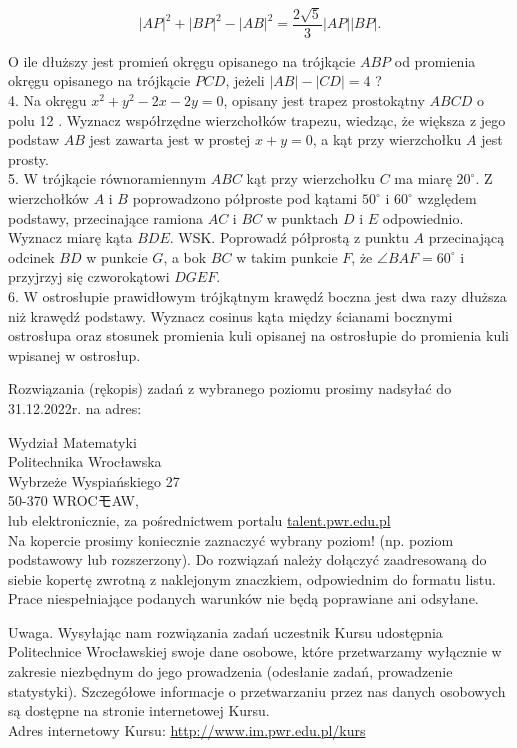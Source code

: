 \documentclass[10pt]{article}
\begin{document}
$$
|A P|^{2}+|B P|^{2}-|A B|^{2}=\frac{2 \sqrt{5}}{3}|A P||B P| .
$$

O ile dłuższy jest promień okręgu opisanego na trójkącie $A B P$ od promienia okręgu opisanego na trójkącie $P C D$, jeżeli $|A B|-|C D|=4$ ?\\
4. Na okręgu $x^{2}+y^{2}-2 x-2 y=0$, opisany jest trapez prostokątny $A B C D$ o polu 12 . Wyznacz współrzędne wierzchołków trapezu, wiedząc, że większa z jego podstaw $A B$ jest zawarta jest w prostej $x+y=0$, a kąt przy wierzchołku $A$ jest prosty.\\
5. W trójkącie równoramiennym $A B C$ kąt przy wierzchołku $C$ ma miarę $20^{\circ}$. Z wierzchołków $A$ i $B$ poprowadzono półproste pod kątami $50^{\circ}$ i $60^{\circ}$ względem podstawy, przecinające ramiona $A C$ i $B C$ w punktach $D$ i $E$ odpowiednio. Wyznacz miarę kąta $B D E$. WSK. Poprowadź półprostą z punktu $A$ przecinającą odcinek $B D$ w punkcie $G$, a bok $B C$ w takim punkcie $F$, że $\angle B A F=60^{\circ}$ i przyjrzyj się czworokątowi $D G E F$.\\
6. W ostrosłupie prawidłowym trójkątnym krawędź boczna jest dwa razy dłuższa niż krawędź podstawy. Wyznacz cosinus kąta między ścianami bocznymi ostrosłupa oraz stosunek promienia kuli opisanej na ostrosłupie do promienia kuli wpisanej w ostrosłup.

Rozwiązania (rękopis) zadań z wybranego poziomu prosimy nadsyłać do 31.12.2022r. na adres:

Wydział Matematyki\\
Politechnika Wrocławska\\
Wybrzeże Wyspiańskiego 27\\
50-370 WROCモAW,\\
lub elektronicznie, za pośrednictwem portalu \href{http://talent.pwr.edu.pl}{talent.pwr.edu.pl}\\
Na kopercie prosimy koniecznie zaznaczyć wybrany poziom! (np. poziom podstawowy lub rozszerzony). Do rozwiązań należy dołączyć zaadresowaną do siebie kopertę zwrotną z naklejonym znaczkiem, odpowiednim do formatu listu. Prace niespełniające podanych warunków nie będą poprawiane ani odsyłane.

Uwaga. Wysyłając nam rozwiązania zadań uczestnik Kursu udostępnia Politechnice Wrocławskiej swoje dane osobowe, które przetwarzamy wyłącznie w zakresie niezbędnym do jego prowadzenia (odesłanie zadań, prowadzenie statystyki). Szczegółowe informacje o przetwarzaniu przez nas danych osobowych są dostępne na stronie internetowej Kursu.\\
Adres internetowy Kursu: \href{http://www.im.pwr.edu.pl/kurs}{http://www.im.pwr.edu.pl/kurs}
\end{document}
